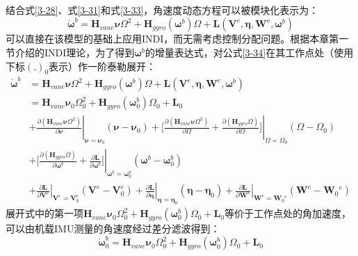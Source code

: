 结合式\eqref{3-28}、式\eqref{3-31}和式\eqref{3-33}，角速度动态方程可以被模块化表示为：
\begin{equation}
    \boldsymbol{\dot{\omega}}^b=\boldsymbol{H}_{vane}\boldsymbol{\nu}\Omega^2+\boldsymbol{H}_{gyro}(\boldsymbol{\omega}^b)\Omega+\boldsymbol{L}(\boldsymbol{V}^e,\boldsymbol{\eta},\boldsymbol{W}^e,\boldsymbol{\omega}^b)
    \label{3-34}
\end{equation}
可以直接在该模型的基础上应用INDI，而无需考虑控制分配问题。根据本章第一节介绍的INDI理论，为了得到$\boldsymbol{\omega}^b$的增量表达式，对公式\eqref{3-34}在其工作点处（使用下标$(.)_0$表示）作一阶泰勒展开：
\begin{equation}
    \begin{aligned}
    \boldsymbol{\dot{\omega}}^b&=\boldsymbol{H}_{vane}\boldsymbol{\nu}\Omega^2+\boldsymbol{H}_{gyro}(\boldsymbol{\omega}^b)\Omega+\boldsymbol{L}(\boldsymbol{V}^e,\boldsymbol{\eta},\boldsymbol{W}^e,\boldsymbol{\omega}^b)\\
    &=\boldsymbol{H}_{vane}\boldsymbol{\nu}_0\Omega_0^2+\boldsymbol{H}_{gyro}(\boldsymbol{\omega}_0^b)\Omega_0+\boldsymbol{L}_0\\
    & +\left.\frac{\partial(\boldsymbol{H}_{vane}\boldsymbol{\nu}\Omega^2)}{\partial\boldsymbol{\nu}}\right|_{\boldsymbol{\nu}=\boldsymbol{\nu}_0}(\boldsymbol{\nu}-\boldsymbol{\nu}_0)
    +\left.\bigg[\frac{\partial(\boldsymbol{H}_{vane}\boldsymbol{\nu}\Omega^2)}{\partial\Omega}+\frac{\partial(\boldsymbol{H}_{gyro}\Omega)}{\partial\Omega}\bigg]\right|_{\Omega=\Omega_0}
    (\Omega-\Omega_0) \\
     & +\left.\bigg[\frac{\partial(\boldsymbol{H}_{gyro}\Omega)}{\partial\boldsymbol{\omega}^{b}}+\frac{\partial\boldsymbol{L}}{\partial\boldsymbol{\omega}^{b}}\bigg]\right|_{\boldsymbol{\omega}^{b}=\boldsymbol{\omega}_{0}^{b}}(\boldsymbol{\omega}^{b}-\boldsymbol{\omega}_{0}^{b})\\
    & +\left.\frac{\partial\boldsymbol{L}}{\partial\boldsymbol{V}^{e}}\right|_{\boldsymbol{V}^{e}=\boldsymbol{V}_{0}^{e}}
    (\boldsymbol{V}^{e}-\boldsymbol{V}_{0}^{e})
    +\left.\frac{\partial\boldsymbol{L}}{\partial\boldsymbol{\eta}}\right|_{\boldsymbol{\eta}=\boldsymbol{\eta}_{0}}(\boldsymbol{\eta}-\boldsymbol{\eta}_{0})
    +\left. \frac{\partial\boldsymbol{L}}{\partial\boldsymbol{W}^e}\right|_{\boldsymbol{W}^e=\boldsymbol{W}_0{}^e}(\boldsymbol{W}^e-\boldsymbol{W}_0{}^e)
    \end{aligned}
    \label{3-35}
\end{equation}
展开式中的第一项$\boldsymbol{H}_{vane}\boldsymbol{\nu}_0\Omega_0^2+\boldsymbol{H}_{gyro}(\boldsymbol{\omega}_0^b)\Omega_0+\boldsymbol{L}_0$等价于工作点处的角加速度，可以由机载IMU测量的角速度经过差分滤波得到：
\begin{equation}
    \boldsymbol{\dot{\omega}}^b_0=\boldsymbol{H}_{vane}\boldsymbol{\nu}_0\Omega_0^2+\boldsymbol{H}_{gyro}(\boldsymbol{\omega}_0^b)\Omega_0+\boldsymbol{L}_0
    \label{3-36}
\end{equation}

